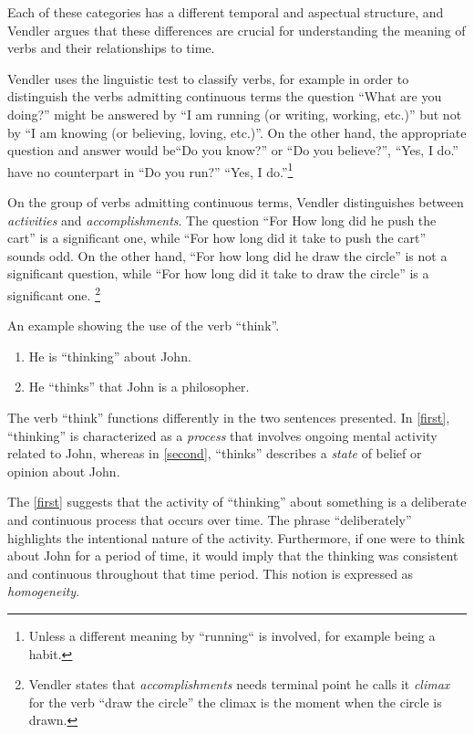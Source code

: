 Each of these categories has a different temporal and aspectual structure, and Vendler argues that these differences are crucial for understanding the meaning of verbs and their relationships to time.



Vendler uses the linguistic test to classify verbs, for example in order to distinguish the verbs admitting continuous terms the question ``What are you doing?'' might be answered by
``I am running (or writing, working, etc.)''
but not by ``I am knowing (or believing, loving, etc.)''. On the other hand, the appropriate question and answer would be``Do you know?'' or ``Do you believe?'',
``Yes, I do.'' have no counterpart in ``Do you run?'' ``Yes, I do.''\footnote{Unless a different meaning by ``running`` is involved, for example being a habit.}

On the group of verbs admitting continuous terms, Vendler distinguishes between \textit{activities} and \textit{accomplishments}. The question 
``For How long did he push the cart'' is a significant one, while ``For how long did it take to push the cart'' sounds odd. On the other hand,
``For how long did he draw the circle'' is not a significant question, while ``For how long did it take to draw the circle'' is a significant one.
\footnote{Vendler states that \textit{accomplishments} needs terminal point he calls it \textit{climax} for the verb ``draw the circle'' the climax is the moment when the circle is drawn.}


\begin{exmp} An example showing the use of the verb ``think''.
  \begin{enumerate}[label=(\arabic*)]
		\item He is ``thinking'' about John. \label{first}
		\item He ``thinks'' that John is a philosopher. \label{second}
	\end{enumerate}

	The verb ``think'' functions differently in the two sentences presented. In  \ref{first}, ``thinking'' is characterized as a \textit{process} that involves ongoing mental activity related to John, whereas in  \ref{second}, ``thinks'' describes a \textit{state} of belief or opinion about John.

	The \ref{first} suggests that the activity of ``thinking'' about something is a deliberate and continuous process that occurs over time. The phrase ``deliberately'' highlights the intentional nature of the activity. Furthermore, if one were to think about John for a period of time, it would imply that the thinking was consistent and continuous throughout that time period. This notion is expressed as \textit{homogeneity}.
\end{exmp}



